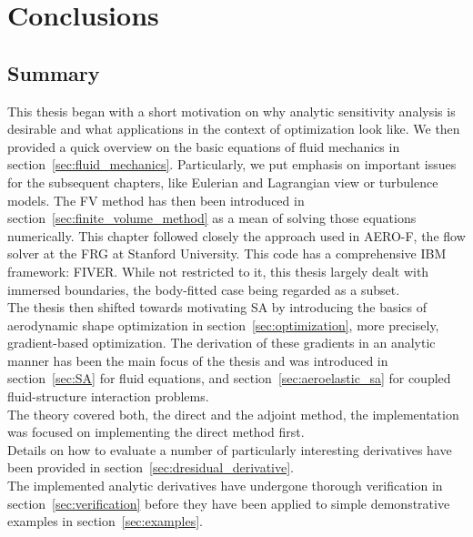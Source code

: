 \documentclass[../main.tex]{subfiles}
\begin{document}
\setlength{\delimitershortfall}{0pt}

\FloatBarrier 
\chapter{Conclusions}\label{sec:conclusions}
\minitoc

\section{Summary}\label{sec:summary}
This thesis began with a short motivation on why analytic sensitivity analysis is desirable and what applications in the context of optimization look like. We then provided a quick overview on the basic equations of fluid mechanics in section~\ref{sec:fluid_mechanics}. Particularly, we put emphasis on important issues for the subsequent chapters, like Eulerian and Lagrangian view or turbulence models.
The \acf{FV} method has then been introduced in section~\ref{sec:finite_volume_method} as a mean of solving those equations numerically. This chapter followed closely the  approach used in AERO-F\cite{Aerof}, the flow solver at the \acf{FRG} at Stanford University. This code has a comprehensive \acf{IBM} framework: \acf{FIVER}\cite{Main2014}. While not restricted to it, this thesis largely dealt with immersed boundaries, the body-fitted case being regarded as a subset.\\
The thesis then shifted towards motivating \acf{SA} by introducing the basics of aerodynamic shape optimization in section~\ref{sec:optimization}, more precisely, gradient-based optimization.
The derivation of these gradients in an analytic manner has been the main focus of the thesis and was introduced in section~\ref{sec:SA} for fluid equations, and section~\ref{sec:aeroelastic_sa} for coupled fluid-structure interaction problems.\\
The theory covered both, the direct and the adjoint method, the implementation was focused on implementing the direct method first.\\
Details on how to evaluate a number of particularly interesting derivatives have been provided in section~\ref{sec:dresidual_derivative}.\\
The implemented analytic derivatives have undergone thorough verification in section~\ref{sec:verification} before they have been applied to simple demonstrative examples in section~\ref{sec:examples}.
\end{document}
